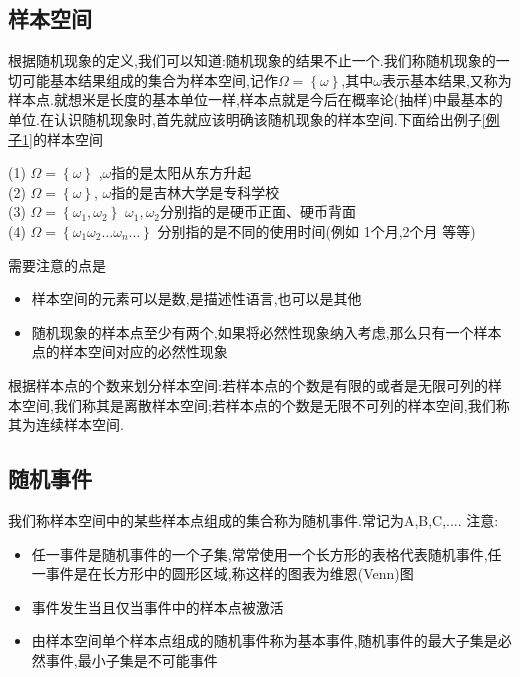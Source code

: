 \subsection{样本空间}
根据随机现象的定义,我们可以知道:随机现象的结果不止一个.我们称随机现象的一切可能基本结果组成的集合为样本空间,记作\(\Omega = \left\{\omega\right\}\),其中\(\omega\)表示基本结果,又称为样本点.就想米是长度的基本单位一样,样本点就是今后在概率论(抽样)中最基本的单位.在认识随机现象时,首先就应该明确该随机现象的样本空间.下面给出例子\ref{例子1}的样本空间 
\begin{Example}
    (1) \(\Omega = \left\{ \omega\right\}\) ,\(\omega\)指的是太阳从东方升起 \\
    (2) \(\Omega = \left\{\omega\right\}\), \(\omega\)指的是吉林大学是专科学校 \\
    (3) \(\Omega = \left\{ \omega_1 , \omega_2\right\} \) \(\omega_1 ,\omega_2\)分别指的是硬币正面、硬币背面 \\
    (4) \(\Omega = \left\{ \omega_1 \omega_2 \dots \omega_n \dots  \right\} \) 分别指的是不同的使用时间(例如 1个月,2个月 等等) 
\end{Example}
需要注意的点是
\begin{itemize}
    \item 样本空间的元素可以是数,是描述性语言,也可以是其他 \\
    \item 随机现象的样本点至少有两个,如果将必然性现象纳入考虑,那么只有一个样本点的样本空间对应的必然性现象 \\
\end{itemize}
根据样本点的个数来划分样本空间:若样本点的个数是有限的或者是无限可列的样本空间,我们称其是离散样本空间;若样本点的个数是无限不可列的样本空间,我们称其为连续样本空间.
\subsection{随机事件}
我们称样本空间中的某些样本点组成的集合称为随机事件.常记为A,B,C,.... 注意: 
\begin{itemize}
    \item 任一事件是随机事件的一个子集,常常使用一个长方形的表格代表随机事件,任一事件是在长方形中的圆形区域,称这样的图表为维恩(Venn)图\\
    \item 事件发生当且仅当事件中的样本点被激活 \\
    \item 由样本空间单个样本点组成的随机事件称为基本事件,随机事件的最大子集是必然事件,最小子集是不可能事件
\end{itemize}
